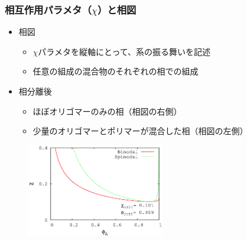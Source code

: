 \documentclass[12pt, dvipdfmx]{beamer}
\begin{document}
\begin{frame}
\end{frame}

	
\begin{frame}\frametitle{相互作用パラメタ（$\chi$）と相図}
\begin{itemize}
	\item 相図
	\begin{itemize}
		\item  $\chi$パラメタを縦軸にとって、系の振る舞いを記述
		\item 任意の組成の混合物のそれぞれの相での組成
	\end{itemize}
	\item 相分離後
	\begin{itemize}
		\item ほぼオリゴマーのみの相（相図の右側）
		\item 少量のオリゴマーとポリマーが混合した相（相図の左側）
	\end{itemize}
\end{itemize}
\vspace{-0.5\baselineskip}
\begin{figure}[htbp]
	\begin{center}
		\includegraphics[width=60mm]{PD_6_600.eps}
	\end{center}
\end{figure}
\end{frame}
\end{document}
